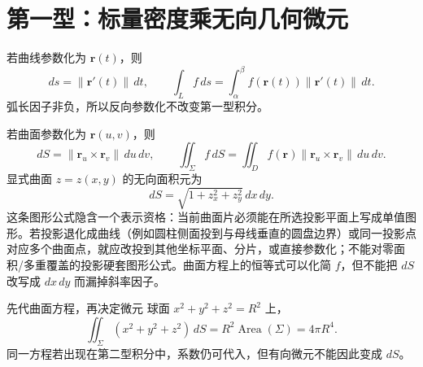 \documentclass[11pt,a4paper,fontset=fandol]{ctexart}
\begin{document}
\begin{center}
\end{center}

\section{第一型：标量密度乘无向几何微元}

若曲线参数化为 $\mathbf r(t)$，则
\[
ds=\lVert\mathbf r'(t)\rVert\,dt,
\qquad
\int_L f\,ds=\int_\alpha^\beta f(\mathbf r(t))\lVert\mathbf r'(t)\rVert\,dt.
\]
弧长因子非负，所以反向参数化不改变第一型积分。

若曲面参数化为 $\mathbf r(u,v)$，则
\[
dS=\lVert\mathbf r_u\times\mathbf r_v\rVert\,du\,dv,
\qquad
\iint_\Sigma f\,dS
=\iint_D f(\mathbf r)\lVert\mathbf r_u\times\mathbf r_v\rVert\,du\,dv.
\]
显式曲面 $z=z(x,y)$ 的无向面积元为
\[
dS=\sqrt{1+z_x^2+z_y^2}\,dx\,dy.
\]
这条图形公式隐含一个表示资格：当前曲面片必须能在所选投影平面上写成单值图形。若投影退化成曲线（例如圆柱侧面投到与母线垂直的圆盘边界）或同一投影点对应多个曲面点，就应改投到其他坐标平面、分片，或直接参数化；不能对零面积/多重覆盖的投影硬套图形公式。曲面方程上的恒等式可以化简 $f$，但不能把 $dS$ 改写成 $dx\,dy$ 而漏掉斜率因子。

\begin{examplebox}{先代曲面方程，再决定微元}
球面 $x^2+y^2+z^2=R^2$ 上，
\[
\iint_\Sigma(x^2+y^2+z^2)\,dS
=R^2\operatorname{Area}(\Sigma)=4\pi R^4.
\]
同一方程若出现在第二型积分中，系数仍可代入，但有向微元不能因此变成 $dS$。
\end{examplebox}
\end{document}
